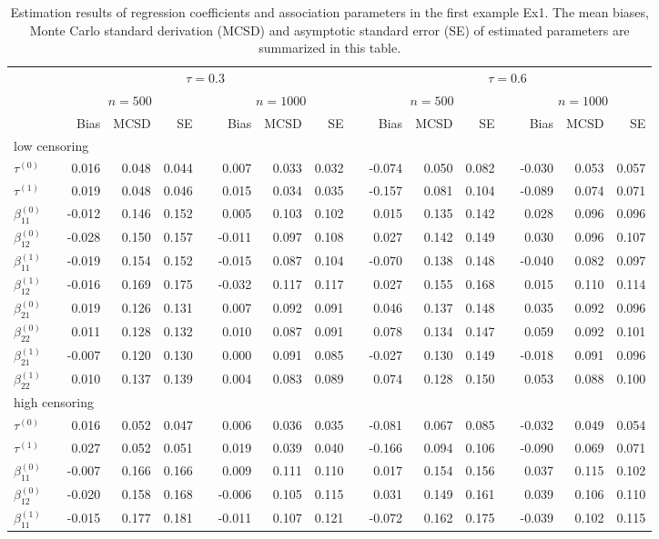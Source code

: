 \documentclass[12pt]{article}
\begin{document}
\begin{table}[htbp]
\footnotesize
\begin{center}
\caption{Estimation results of regression coefficients and association parameters in the first example Ex1. The mean biases, Monte Carlo standard derivation (MCSD) and asymptotic standard error (SE) of estimated parameters are summarized in this table.}
\label{tab:est_coef_ex1}
\begin{tabular}{lrrrrrrrrrrrrrrrr}
\hline\hline
& &\multicolumn{7}{c}{$\tau=0.3$}&&\multicolumn{7}{c}{$\tau=0.6$}\tabularnewline
\cline{3-9}\cline{11-17}
& &\multicolumn{3}{c}{$n=500$}&&\multicolumn{3}{c}{$n=1000$}&&\multicolumn{3}{c}{$n=500$}&&\multicolumn{3}{c}{$n=1000$}\tabularnewline
\cline{3-5}\cline{7-9}\cline{11-13}
\cline{15-17}
 && Bias& MCSD&SE& & Bias& MCSD&SE& & Bias& MCSD&SE&& Bias& MCSD&SE \tabularnewline
 \hline
\multicolumn{5}{l}{low censoring}\tabularnewline
$\tau^{(0)}$&& 0.016&0.048&0.044& & 0.007&0.033&0.032& &-0.074&0.050&0.082& &-0.030&0.053&0.057\tabularnewline
$\tau^{(1)}$&& 0.019&0.048&0.046& & 0.015&0.034&0.035&&-0.157&0.081&0.104& &-0.089&0.074&0.071\tabularnewline
$\beta_{11}^{(0)}$&&-0.012&0.146&0.152& & 0.005&0.103&0.102&& 0.015&0.135&0.142&& 0.028&0.096& 0.096\tabularnewline
$\beta_{12}^{(0)}$&&-0.028&0.150&0.157& &-0.011&0.097&0.108&& 0.027&0.142&0.149&& 0.030&0.096&0.107\tabularnewline
$\beta_{11}^{(1)}$&&-0.019&0.154&0.152& &-0.015&0.087&0.104&&-0.070&0.138&0.148&&-0.040&0.082&0.097\tabularnewline
$\beta_{12}^{(1)}$&&-0.016&0.169&0.175& &-0.032&0.117&0.117&& 0.027&0.155&0.168&& 0.015&0.110&0.114\tabularnewline
$\beta_{21}^{(0)}$&& 0.019&0.126&0.131& & 0.007&0.092&0.091&& 0.046&0.137&0.148&& 0.035&0.092&0.096\tabularnewline
$\beta_{22}^{(0)}$&& 0.011&0.128&0.132& & 0.010&0.087&0.091&& 0.078&0.134&0.147&& 0.059&0.092&0.101\tabularnewline
$\beta_{21}^{(1)}$&&-0.007&0.120&0.130& & 0.000&0.091&0.085&&-0.027&0.130&0.149&&-0.018&0.091&0.096\tabularnewline
$\beta_{22}^{(1)}$&& 0.010&0.137&0.139& & 0.004&0.083&0.089&& 0.074&0.128&0.150&& 0.053&0.088&0.100\tabularnewline
\hline
\multicolumn{5}{l}{high censoring}\tabularnewline
$\tau^{(0)}$&& 0.016&0.052&0.047 && 0.006&0.036&0.035 &&-0.081&0.067&0.085 &&-0.032&0.049&0.054\tabularnewline
$\tau^{(1)}$&& 0.027&0.052&0.051 && 0.019&0.039&0.040 &&-0.166&0.094&0.106 &&-0.090&0.069&0.071\tabularnewline
$\beta_{11}^{(0)}$&&-0.007&0.166&0.166 && 0.009&0.111&0.110 && 0.017&0.154& 0.156&& 0.037&0.115&0.102\tabularnewline
$\beta_{12}^{(0)}$&&-0.020&0.158&0.168 &&-0.006&0.105&0.115 && 0.031&0.149&0.161 && 0.039&0.106&0.110\tabularnewline
$\beta_{11}^{(1)}$&&-0.015&0.177&0.181 &&-0.011&0.107& 0.121&&-0.072&0.162&0.175 &&-0.039&0.102&0.115\tabularnewline

\end{tabular}
\end{center}
\end{table}
\end{document}
